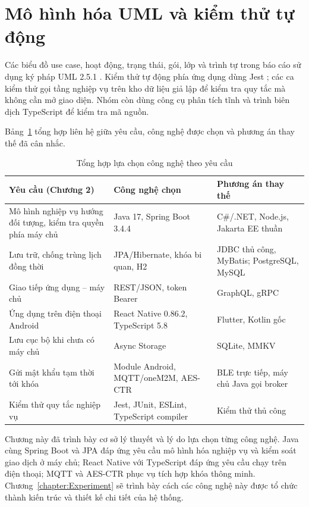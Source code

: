 \documentclass[../DoAn.tex]{subfiles}
\begin{document}
\section{Mô hình hóa UML và kiểm thử tự động}
\label{section:3.7}
Các biểu đồ use case, hoạt động, trạng thái, gói, lớp và trình tự trong báo cáo sử dụng ký pháp UML 2.5.1 \cite{uml251}. Kiểm thử tự động phía ứng dụng dùng Jest \cite{jest}; các ca kiểm thử gọi tầng nghiệp vụ trên kho dữ liệu giả lập để kiểm tra quy tắc mà không cần mở giao diện. Nhóm còn dùng công cụ phân tích tĩnh và trình biên dịch TypeScript để kiểm tra mã nguồn.

Bảng~\ref{tab:congnghe} tổng hợp liên hệ giữa yêu cầu, công nghệ được chọn và phương án thay thế đã cân nhắc.

\begin{table}[H]
\centering\small
\renewcommand{\arraystretch}{1.2}
\caption{Tổng hợp lựa chọn công nghệ theo yêu cầu}
\label{tab:congnghe}
\begin{tabularx}{\textwidth}{|p{4.2cm}|p{3.9cm}|X|}
\hline
\textbf{Yêu cầu (Chương 2)} & \textbf{Công nghệ chọn} & \textbf{Phương án thay thế} \\ \hline
Mô hình nghiệp vụ hướng đối tượng, kiểm tra quyền phía máy chủ & Java 17, Spring Boot 3.4.4 & C\#/.NET, Node.js, Jakarta EE thuần \\ \hline
Lưu trữ, chống trùng lịch đồng thời & JPA/Hibernate, khóa bi quan, H2 & JDBC thủ công, MyBatis; PostgreSQL, MySQL \\ \hline
Giao tiếp ứng dụng -- máy chủ & REST/JSON, token Bearer & GraphQL, gRPC \\ \hline
Ứng dụng trên điện thoại Android & React Native 0.86.2, TypeScript 5.8 & Flutter, Kotlin gốc \\ \hline
Lưu cục bộ khi chưa có máy chủ & Async Storage & SQLite, MMKV \\ \hline
Gửi mật khẩu tạm thời tới khóa & Module Android, MQTT/oneM2M, AES-CTR & BLE trực tiếp, máy chủ Java gọi broker \\ \hline
Kiểm thử quy tắc nghiệp vụ & Jest, JUnit, ESLint, TypeScript compiler & Kiểm thử thủ công \\ \hline
\end{tabularx}
\end{table}

Chương này đã trình bày cơ sở lý thuyết và lý do lựa chọn từng công nghệ. Java cùng Spring Boot và JPA đáp ứng yêu cầu mô hình hóa nghiệp vụ và kiểm soát giao dịch ở máy chủ; React Native với TypeScript đáp ứng yêu cầu chạy trên điện thoại; MQTT và AES-CTR phục vụ tích hợp khóa thông minh. Chương~\ref{chapter:Experiment} sẽ trình bày cách các công nghệ này được tổ chức thành kiến trúc và thiết kế chi tiết của hệ thống.
\end{document}

